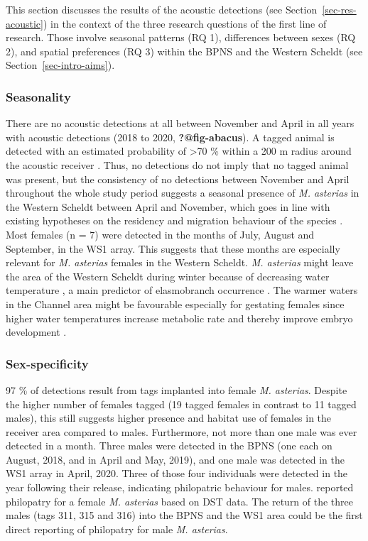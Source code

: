 \documentclass[
  authoryear,
  review,
  3p]{elsarticle}
\begin{document}
This section discusses the results of the acoustic detections (see
Section~\ref{sec-res-acoustic}) in the context of the three research
questions of the first line of research. Those involve seasonal patterns
(RQ 1), differences between sexes (RQ 2), and spatial preferences (RQ 3)
within the BPNS and the Western Scheldt (see
Section~\ref{sec-intro-aims}).

\hypertarget{sec-disc-acoustic-seasonality}{%
\subsubsection{Seasonality}\label{sec-disc-acoustic-seasonality}}

There are no acoustic detections at all between November and April in
all years with acoustic detections (2018 to 2020,
\textbf{?@fig-abacus}). A tagged animal is detected with an estimated
probability of \textgreater70 \% within a 200 m radius around the
acoustic receiver \citep{reubens_2018}. Thus, no detections do not imply
that no tagged animal was present, but the consistency of no detections
between November and April throughout the whole study period suggests a
seasonal presence of \emph{M. asterias} in the Western Scheldt between
April and November, which goes in line with existing hypotheses on the
residency and migration behaviour of the species
\citep{breve_2016, breve_2020, griffiths_2020}. Most females (n = 7)
were detected in the months of July, August and September, in the WS1
array. This suggests that these months are especially relevant for
\emph{M. asterias} females in the Western Scheldt. \emph{M. asterias}
might leave the area of the Western Scheldt during winter because of
decreasing water temperature \citep{breve_2016}, a main predictor of
elasmobranch occurrence \citep{martin_2010}. The warmer waters in the
Channel area might be favourable especially for gestating females since
higher water temperatures increase metabolic rate and thereby improve
embryo development \citep{hurst_1999}.

\hypertarget{sex-specificity}{%
\subsubsection{Sex-specificity}\label{sex-specificity}}

97 \% of detections result from tags implanted into female \emph{M.
asterias}. Despite the higher number of females tagged (19 tagged
females in contrast to 11 tagged males), this still suggests higher
presence and habitat use of females in the receiver area compared to
males. Furthermore, not more than one male was ever detected in a month.
Three males were detected in the BPNS (one each on August, 2018, and in
April and May, 2019), and one male was detected in the WS1 array in
April, 2020. Three of those four individuals were detected in the year
following their release, indicating philopatric behaviour for males.
\citet{griffiths_2020} reported philopatry for a female \emph{M.
asterias} based on DST data. The return of the three males (tags 311,
315 and 316) into the BPNS and the WS1 area could be the first direct
reporting of philopatry for male \emph{M. asterias}.
\end{document}
